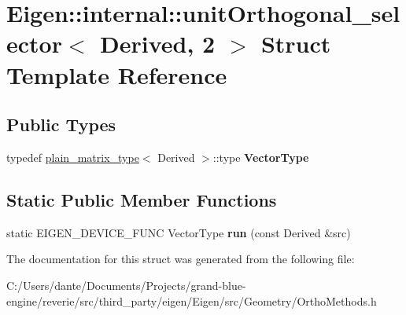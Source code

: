 \hypertarget{struct_eigen_1_1internal_1_1unit_orthogonal__selector_3_01_derived_00_012_01_4}{}\section{Eigen\+::internal\+::unit\+Orthogonal\+\_\+selector$<$ Derived, 2 $>$ Struct Template Reference}
\label{struct_eigen_1_1internal_1_1unit_orthogonal__selector_3_01_derived_00_012_01_4}
\subsection*{Public Types}
\begin{DoxyCompactItemize}
\item 
\mbox{\label{struct_eigen_1_1internal_1_1unit_orthogonal__selector_3_01_derived_00_012_01_4_aeb08f2f9f5e1b2f74a06f1dc74e7ce08}} 
typedef \mbox{\hyperlink{struct_eigen_1_1internal_1_1plain__matrix__type}{plain\+\_\+matrix\+\_\+type}}$<$ Derived $>$\+::type {\bfseries Vector\+Type}
\end{DoxyCompactItemize}
\subsection*{Static Public Member Functions}
\begin{DoxyCompactItemize}
\item 
\mbox{\label{struct_eigen_1_1internal_1_1unit_orthogonal__selector_3_01_derived_00_012_01_4_a92196490f555a41b42aeb6165ac1bf9b}} 
static E\+I\+G\+E\+N\+\_\+\+D\+E\+V\+I\+C\+E\+\_\+\+F\+U\+NC Vector\+Type {\bfseries run} (const Derived \&src)
\end{DoxyCompactItemize}


The documentation for this struct was generated from the following file\+:\begin{DoxyCompactItemize}
\item 
C\+:/\+Users/dante/\+Documents/\+Projects/grand-\/blue-\/engine/reverie/src/third\+\_\+party/eigen/\+Eigen/src/\+Geometry/Ortho\+Methods.\+h\end{DoxyCompactItemize}
